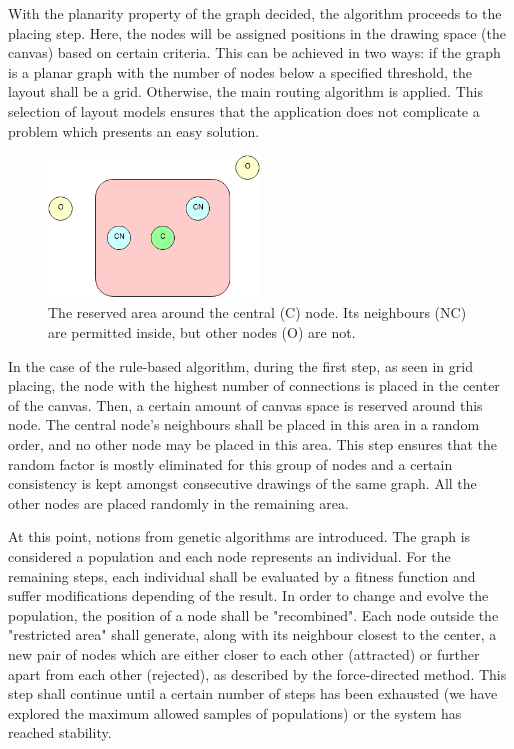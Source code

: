 With the planarity property of the graph decided, the algorithm proceeds to the placing step. Here, the nodes will be assigned positions in the 
drawing space (the canvas) based on certain criteria. This can be achieved in two ways: if the graph is a planar graph with the number of nodes 
below a specified threshold, the layout shall be a grid. Otherwise, the main routing algorithm is applied. This selection of layout models ensures 
that the application does not complicate a problem which presents an easy solution.

\begin{figure}[ht] \centering
\includegraphics[width=0.5\textwidth]{img/algdesing/centralnode.png}
\caption{The reserved area around the central (C) node. Its neighbours (NC) are permitted inside, but other nodes (O) are not.} \end{figure}

In the case of the rule-based algorithm, during the first step, as seen in grid placing, the node with the highest number of connections is 
placed in the center of the canvas. Then, a certain amount of canvas space is reserved around this node. The central node's neighbours 
shall be placed in this area in a random order, and no other node may be placed in this area. This step ensures that the random factor is mostly eliminated 
 for this group of nodes and a certain consistency is kept amongst consecutive drawings of the same graph. All the other nodes are placed randomly in the remaining area.

At this point, notions from genetic algorithms are introduced. The graph is considered a population and each node represents an individual. For the 
remaining steps, each individual shall be evaluated by a fitness function and suffer modifications depending of the result. In order to change and evolve 
the population, the position of a node shall be "recombined". Each node outside the "restricted area" shall generate, along with its neighbour closest to 
the center, a new pair of nodes which are either closer to each other (attracted) or further apart from each other (rejected), as described by the force-directed method. This step shall 
continue until a certain number of steps has been exhausted (we have explored the maximum allowed samples of populations) or the system has reached stability.

